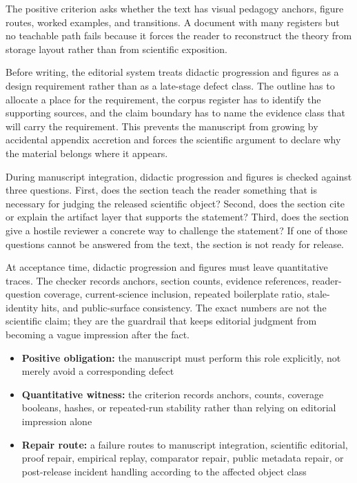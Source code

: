 The positive criterion asks whether the text has visual pedagogy anchors, figure routes, worked examples, and transitions. A document with many registers but no teachable path fails because it forces the reader to reconstruct the theory from storage layout rather than from scientific exposition.


Before writing, the editorial system treats didactic progression and figures as a design requirement rather than as a late-stage defect class. The outline has to allocate a place for the requirement, the corpus register has to identify the supporting sources, and the claim boundary has to name the evidence class that will carry the requirement. This prevents the manuscript from growing by accidental appendix accretion and forces the scientific argument to declare why the material belongs where it appears.


During manuscript integration, didactic progression and figures is checked against three questions. First, does the section teach the reader something that is necessary for judging the released scientific object? Second, does the section cite or explain the artifact layer that supports the statement? Third, does the section give a hostile reviewer a concrete way to challenge the statement? If one of those questions cannot be answered from the text, the section is not ready for release.


At acceptance time, didactic progression and figures must leave quantitative traces. The checker records anchors, section counts, evidence references, reader-question coverage, current-science inclusion, repeated boilerplate ratio, stale-identity hits, and public-surface consistency. The exact numbers are not the scientific claim; they are the guardrail that keeps editorial judgment from becoming a vague impression after the fact.


\begin{itemize}[leftmargin=1.8em]

\item \textbf{Positive obligation:} the manuscript must perform this role explicitly, not merely avoid a corresponding defect

\item \textbf{Quantitative witness:} the criterion records anchors, counts, coverage booleans, hashes, or repeated-run stability rather than relying on editorial impression alone

\item \textbf{Repair route:} a failure routes to manuscript integration, scientific editorial, proof repair, empirical replay, comparator repair, public metadata repair, or post-release incident handling according to the affected object class

\end{itemize}

